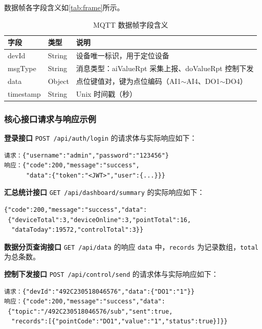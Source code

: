 \documentclass[12pt,hyperref,a4paper,UTF8]{ctexart}
\begin{document}
数据帧各字段含义如\autoref{tab:frame}所示。

\begin{table}[!htbp]
    \centering
    \caption{MQTT 数据帧字段含义}
    \label{tab:frame}
    \begin{tabularx}{0.90\textwidth}{@{}L{2.2cm} L{2.0cm} Y@{}}
    \toprule
    \textbf{字段} & \textbf{类型} & \textbf{说明} \\
    \midrule
    devId & String & 设备唯一标识，用于定位设备 \\
    msgType & String & 消息类型：aiValueRpt 采集上报、doValueRpt 控制下发 \\
    data & Object & 点位键值对，键为点位编码（AI1$\sim$AI4、DO1$\sim$DO4） \\
    timestamp & String & Unix 时间戳（秒） \\
    \bottomrule
    \end{tabularx}
\end{table}

\subsubsection{核心接口请求与响应示例}

\textbf{登录接口} \texttt{POST /api/auth/login} 的请求体与实际响应如下：

\begin{verbatim}
请求：{"username":"admin","password":"123456"}
响应：{"code":200,"message":"success",
      "data":{"token":"<JWT>","user":{...}}}
\end{verbatim}

\textbf{汇总统计接口} \texttt{GET /api/dashboard/summary} 的实际响应如下：

\begin{verbatim}
{"code":200,"message":"success","data":
 {"deviceTotal":3,"deviceOnline":3,"pointTotal":16,
  "dataToday":19572,"controlTotal":3}}
\end{verbatim}

\textbf{数据分页查询接口} \texttt{GET /api/data} 的响应 \texttt{data} 中，\texttt{records} 为记录数组，\texttt{total} 为总条数。

\textbf{控制下发接口} \texttt{POST /api/control/send} 的请求体与实际响应如下：

\begin{verbatim}
请求：{"devId":"492C230518046576","data":{"DO1":"1"}}
响应：{"code":200,"message":"success","data":
 {"topic":"/492C230518046576/sub","sent":true,
  "records":[{"pointCode":"DO1","value":"1","status":true}]}}
\end{verbatim}
\end{document}
